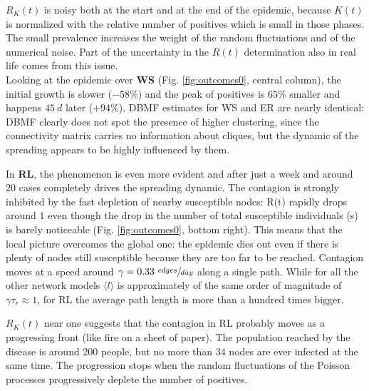\documentclass[DIV=12, BCOR=0pt]{scrartcl}  %
\begin{document}
  $R_K(t)$ is noisy both at the start and at the end of the epidemic, because $K(t)$ is normalized with the relative number of positives which is small in those phases.
  The small prevalence increases the weight of the random fluctuations and of the numerical noise. Part of the uncertainty in the $R(t)$ determination also in real life comes from this issue.\\
  
  Looking at the epidemic over \textbf{WS} (Fig. \ref{fig:outcomes0}, central column), the initial growth is slower ($- 58 \%$) and the peak of positives is $65 \%$ smaller and happens $45 \ d$ later ($+ 94 \%$). DBMF estimates for WS and ER are nearly identical: DBMF clearly does not spot the presence of higher clustering, since the connectivity matrix carries no information about cliques, but the dynamic of the spreading appears to be highly influenced by them.
  
  In \textbf{RL}, the phenomenon is even more evident and after just a week and around $20$ cases completely drives the spreading dynamic. The contagion is strongly inhibited by the fast depletion of nearby susceptible nodes: R(t) rapidly drops around $1$ even though the drop in the number of total susceptible individuals (s) is barely noticeable (Fig. \ref{fig:outcomes0}, bottom right). This means that the local picture overcomes the global one: the epidemic dies out even if there is plenty of nodes still susceptible because they are too far to be reached. Contagion moves at a speed around $\gamma = 0.33 \ \sfrac{edges}{day}$ along a single path. While for all the other network models $\langle l \rangle $ is approximately of the same order of magnitude of $\gamma \tau_r \approx 1 $, for RL the average path length is more than a hundred times bigger.
  
  $R_K(t)$ near one suggests that the contagion in RL probably moves as a progressing front (like fire on a sheet of paper). The population reached by the disease is around 200 people, but no more than 34 nodes are ever infected at the same time. The progression stops when the random fluctuations of the Poisson processes progressively deplete the number of positives.\\
  
\end{document}
